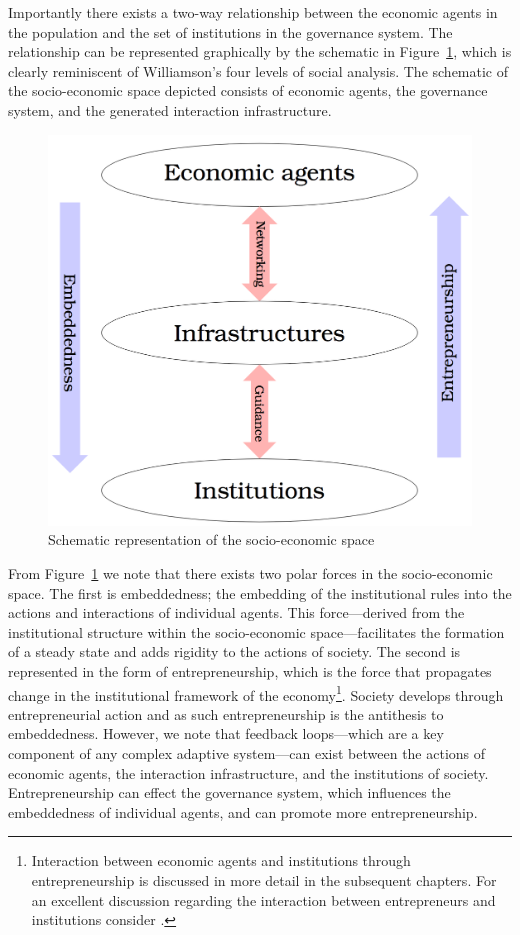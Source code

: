 Importantly there exists a two-way relationship between the economic agents in the population and the set of institutions in the governance system. The relationship can be represented graphically by the schematic in Figure~\ref{spacestructure}, which is clearly reminiscent of Williamson's four levels of social analysis. The schematic of the socio-economic space depicted consists of economic agents, the governance system, and the generated interaction infrastructure.

\begin{figure}[t]
\centering
\includegraphics[scale=0.25]{imgs/structure-space.png}
\caption{Schematic representation of the socio-economic space}
\label{spacestructure}
\end{figure}

From Figure~\ref{spacestructure} we note that there exists two polar forces in the socio-economic space. The first is embeddedness; the embedding of the institutional rules into the actions and interactions of individual agents. This force---derived from the institutional structure within the socio-economic space---facilitates the formation of a steady state and adds rigidity to the actions of society. The second is represented in the form of entrepreneurship, which is the force that propagates change in the institutional framework of the economy\footnote{Interaction between economic agents and institutions through entrepreneurship is discussed in more detail in the subsequent chapters. For an excellent discussion regarding the interaction between entrepreneurs and institutions consider \citet{HenreksonSanandaji2011}.}. Society develops through entrepreneurial action and as such entrepreneurship is the antithesis to embeddedness. However, we note that feedback loops---which are a key component of any complex adaptive system---can exist between the actions of economic agents, the interaction infrastructure, and the institutions of society. Entrepreneurship can effect the governance system, which influences the embeddedness of individual agents, and can promote more entrepreneurship.

